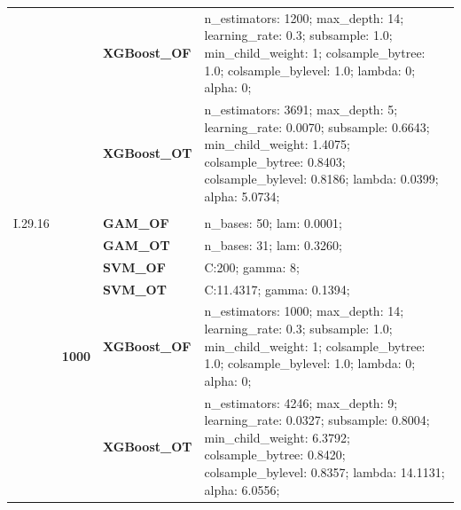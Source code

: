 \documentclass[runningheads]{llncs}
\begin{document}
\begin{table}
\begin{tabularx}{\textwidth}{>{\RaggedRight\arraybackslash}m{1.6cm}p{1.225cm}p{2.05cm}>{\RaggedRight\arraybackslash}X}
        \textbf{}                               & \textbf{}                         & \textbf{XGBoost\_OF} & n\_estimators: 1200; max\_depth: 14; learning\_rate: 0.3; subsample: 1.0; min\_child\_weight: 1; colsample\_bytree: 1.0; colsample\_bylevel: 1.0; lambda: 0; alpha: 0;                            \\
        \textbf{}                               & \textbf{}                         & \textbf{XGBoost\_OT} & n\_estimators: 3691; max\_depth: 5; learning\_rate: 0.0070; subsample: 0.6643; min\_child\_weight: 1.4075; colsample\_bytree: 0.8403; colsample\_bylevel: 0.8186; lambda: 0.0399; alpha: 5.0734;  \\
        \cline{1-4}
        \multirow[t]{14}{=}{\textbf{Feynman                                                                                                                                                                                                                                                                    \\I.29.16}} & \multirow[t]{7}{*}{\textbf{1000}} & \textbf{GAM\_OF} & n\_bases: 50; lam: 0.0001;  \\
        \textbf{}                               & \textbf{}                         & \textbf{GAM\_OT}     & n\_bases: 31; lam: 0.3260;                                                                                                                                                                        \\
        \textbf{}                               & \textbf{}                         & \textbf{SVM\_OF}     & C:\@200; gamma: 8;                                                                                                                                                                                \\
        \textbf{}                               & \textbf{}                         & \textbf{SVM\_OT}     & C:\@11.4317; gamma: 0.1394;                                                                                                                                                                       \\
        \textbf{}                               & \textbf{}                         & \textbf{XGBoost\_OF} & n\_estimators: 1000; max\_depth: 14; learning\_rate: 0.3; subsample: 1.0; min\_child\_weight: 1; colsample\_bytree: 1.0; colsample\_bylevel: 1.0; lambda: 0; alpha: 0;                            \\
        \textbf{}                               & \textbf{}                         & \textbf{XGBoost\_OT} & n\_estimators: 4246; max\_depth: 9; learning\_rate: 0.0327; subsample: 0.8004; min\_child\_weight: 6.3792; colsample\_bytree: 0.8420; colsample\_bylevel: 0.8357; lambda: 14.1131; alpha: 6.0556; \\

\end{tabularx}
\end{table}
\end{document}
